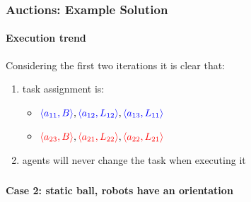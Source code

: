 \begin{frame}
	\frametitle{Auctions: Example Solution}
	\framesubtitle{Execution trend}
	
	\Large
	
	Considering the first two iterations it is clear that:
	
	\vspace{0.1cm}
	
	\begin{enumerate}
		\item task assignment is:
			  \begin{itemize}
				  \vspace{0.1cm}
			  	  \item $ \textcolor{blue}{\langle a_{11},B \rangle}, \textcolor{blue}{\langle
						  a_{12},L_{12} \rangle}, \textcolor{blue}{\langle a_{13},L_{11}
						  \rangle} $
				  \vspace{0.1cm}
				  \item $ \textcolor{red}{\langle a_{23},B \rangle}, \textcolor{red}{\langle
				  		  a_{21},L_{22} \rangle}, \textcolor{red}{\langle a_{22},L_{21} \rangle}
				  		  $
			  \end{itemize}
		\vspace{0.1cm}
		\item agents will never change the task when executing it
	\end{enumerate}
\end{frame}

\begin{frame}
	\frametitle{}
	
	\Large
	
	\vspace{0.7cm}
	
	\begin{center}
		\textbf{Case 2: static ball, robots have an orientation}
	\end{center}
\end{frame}

